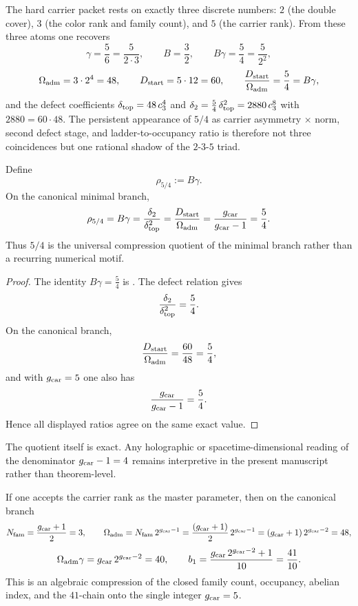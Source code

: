 \begin{remark}
The hard carrier packet rests on exactly three discrete numbers: $2$ (the double cover), $3$ (the color rank and family count), and $5$ (the carrier rank). From these three atoms one recovers
\[
\gamma=\frac{5}{6}=\frac{5}{2\cdot 3},
\qquad
B=\frac{3}{2},
\qquad
B\gamma=\frac{5}{4}=\frac{5}{2^2},
\]
\[
\Omega_{\mathrm{adm}}=3\cdot 2^4=48,
\qquad
D_{\mathrm{start}}=5\cdot 12=60,
\qquad
\frac{D_{\mathrm{start}}}{\Omega_{\mathrm{adm}}}=\frac{5}{4}=B\gamma,
\]
and the defect coefficients $\delta_{\mathrm{top}}=48\,c_3^4$ and $\delta_2=\frac54\,\delta_{\mathrm{top}}^2=2880\,c_3^8$ with $2880=60\cdot 48$.
The persistent appearance of $5/4$ as carrier asymmetry $\times$ norm, second defect stage, and ladder-to-occupancy ratio is therefore not three coincidences but one rational shadow of the $2$-$3$-$5$ triad.
\end{remark}

\begin{lemma}
\label{lem:universal-5-4-compression}
Define
\[
\rho_{5/4}:=B\gamma.
\]
On the canonical minimal branch,
\[
\rho_{5/4}
=
B\gamma
=
\frac{\delta_2}{\delta_{\mathrm{top}}^2}
=
\frac{D_{\mathrm{start}}}{\Omega_{\mathrm{adm}}}
=
\frac{g_{\mathrm{car}}}{g_{\mathrm{car}}-1}
=
\frac54.
\]
Thus $5/4$ is the universal compression quotient of the minimal branch rather than a recurring numerical motif.
\end{lemma}

\begin{proof}
The identity $B\gamma=\frac54$ is . The defect relation gives
\[
\frac{\delta_2}{\delta_{\mathrm{top}}^2}=\frac54.
\]
On the canonical branch,
\[
\frac{D_{\mathrm{start}}}{\Omega_{\mathrm{adm}}}=\frac{60}{48}=\frac54,
\]
and with $g_{\mathrm{car}}=5$ one also has
\[
\frac{g_{\mathrm{car}}}{g_{\mathrm{car}}-1}=\frac{5}{4}.
\]
Hence all displayed ratios agree on the same exact value.
\end{proof}

\begin{remark}
The quotient itself is exact. Any holographic or spacetime-dimensional reading of the denominator $g_{\mathrm{car}}-1=4$ remains interpretive in the present manuscript rather than theorem-level.
\end{remark}

\begin{remark}
If one accepts the carrier rank as the master parameter, then on the canonical branch
\[
N_{\mathrm{fam}}=\frac{g_{\mathrm{car}}+1}{2}=3,
\qquad
\Omega_{\mathrm{adm}}=N_{\mathrm{fam}}\,2^{g_{\mathrm{car}}-1}=\frac{(g_{\mathrm{car}}+1)}{2}\,2^{g_{\mathrm{car}}-1}=(g_{\mathrm{car}}+1)\,2^{g_{\mathrm{car}}-2}=48,
\]
\[
\Omega_{\mathrm{adm}}\gamma=g_{\mathrm{car}}\,2^{g_{\mathrm{car}}-2}=40,
\qquad
b_1=\frac{g_{\mathrm{car}}\,2^{g_{\mathrm{car}}-2}+1}{10}=\frac{41}{10}.
\]
This is an algebraic compression of the closed family count, occupancy, abelian index, and the
$41$-chain onto the single integer $g_{\mathrm{car}}=5$.
\end{remark}

